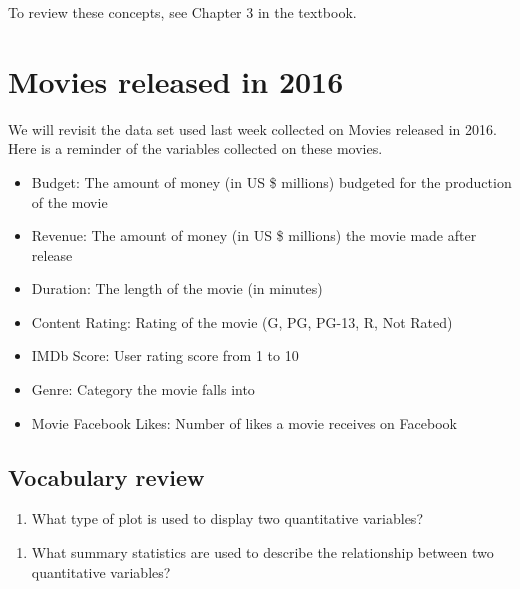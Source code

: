 \documentclass[
]{report}
\providecommand{\tightlist}{%
  \setlength{\itemsep}{0pt}\setlength{\parskip}{0pt}}
\begin{document}
To review these concepts, see Chapter 3 in the textbook.

\hypertarget{movies-released-in-2016}{%
\section{Movies released in 2016}\label{movies-released-in-2016}}

We will revisit the data set used last week collected on Movies released in 2016. Here is a reminder of the variables collected on these movies.

\begin{itemize}
\item
  Budget: The amount of money (in US \$ millions) budgeted for the production of the movie
\item
  Revenue: The amount of money (in US \$ millions) the movie made after release
\item
  Duration: The length of the movie (in minutes)
\item
  Content Rating: Rating of the movie (G, PG, PG-13, R, Not Rated)
\item
  IMDb Score: User rating score from 1 to 10
\item
  Genre: Category the movie falls into
\item
  Movie Facebook Likes: Number of likes a movie receives on Facebook
\end{itemize}

\hypertarget{vocabulary-review}{%
\subsection{Vocabulary review}\label{vocabulary-review}}

\begin{enumerate}
\def\labelenumi{\arabic{enumi}.}
\tightlist
\item
  What type of plot is used to display two quantitative variables?
\end{enumerate}

\vspace{0.2in}

\begin{enumerate}
\def\labelenumi{\arabic{enumi}.}
\setcounter{enumi}{1}
\tightlist
\item
  What summary statistics are used to describe the relationship between two quantitative variables?
\end{enumerate}

\vspace{0.3in}
\end{document}
